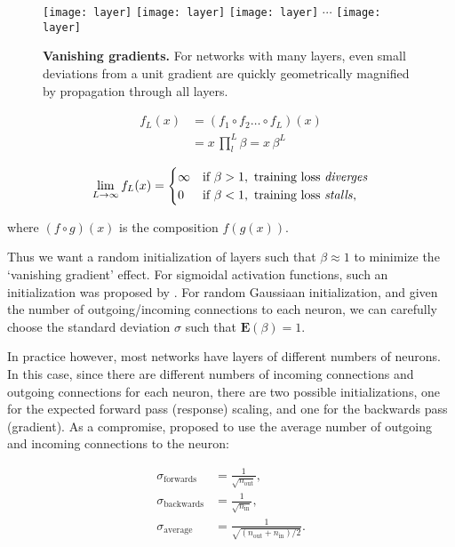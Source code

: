 \documentclass[thesis]{subfiles}
\begin{document}
\begin{figure}[tbp]
	\texttt{[image: layer]}
	\texttt{[image: layer]}
	\texttt{[image: layer]}
	$\cdots$
	\texttt{[image: layer]}
	\caption[Vanishing gradients.]{\textbf{Vanishing gradients.} For networks with many layers, even small deviations from a unit gradient are quickly geometrically magnified by propagation through all layers.}\label{fig:manylayers}
\end{figure}
\begin{equation}
\begin{aligned}
	f_L(x) & = (f_1 \circ f_2 \ldots \circ f_L) (x)\\
	& = x \, \prod^{L}_{l} \beta = x\, \beta^L
\end{aligned}
\end{equation}

\[
\lim_{L\to\infty} f_L(x) = 
\begin{cases}
\infty & \text{if } \beta > 1, \text{ training loss \emph{diverges}}\\
0 & \text{if } \beta < 1, \text{ training loss \emph{stalls}},
\end{cases}
\]

where $(f \circ g)(x)$ is the composition $f(g(x))$.

Thus we want a random initialization of layers such that $\beta\approx 1$ to minimize the `vanishing gradient' effect. For sigmoidal activation functions, such an initialization was proposed by \citet{glorot2010understanding}. For random Gaussiaan initialization, and given the number of outgoing/incoming connections to each neuron, we can carefully choose the standard deviation $\sigma$ such that $\mathbf{E}(\beta) = 1$. 

In practice however, most networks have layers of different numbers of neurons. In this case, since there are different numbers of incoming connections and outgoing connections for each neuron, there are two possible initializations, one for the expected forward pass (response) scaling, and one for the backwards pass (gradient). As a compromise, \citet{glorot2010understanding} proposed to use the average number of outgoing and incoming connections to the neuron:

\begin{equation}
\begin{aligned}
	\sigma_{\textrm{forwards}} &= \frac{1}{\sqrt{n_{\text{out}}}},\\
	\sigma_{\textrm{backwards}} &= \frac{1}{\sqrt{n_{\text{in}}}},\\
	\sigma_{\textrm{average}} &= \frac{1}{\sqrt{(n_{\text{out}} + n_{\text{in}})/2}}.
\end{aligned}
\end{equation}
\end{document}
